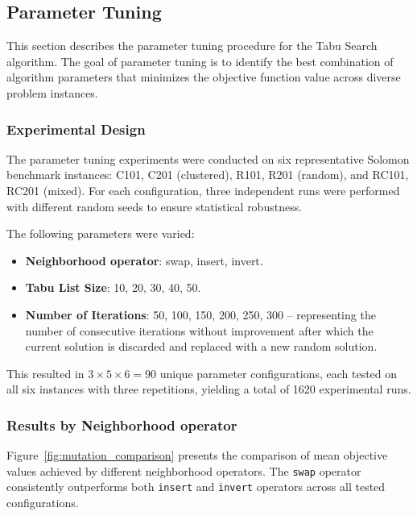 \subsection{Parameter Tuning}

This section describes the parameter tuning procedure for the Tabu Search algorithm. The goal of parameter tuning is to identify the best combination of algorithm parameters that minimizes the objective function value across diverse problem instances.

\subsubsection{Experimental Design}

The parameter tuning experiments were conducted on six representative Solomon benchmark instances: C101, C201 (clustered), R101, R201 (random), and RC101, RC201 (mixed). For each configuration, three independent runs were performed with different random seeds to ensure statistical robustness.

The following parameters were varied:
\begin{itemize}
    \item \textbf{Neighborhood operator}: swap, insert, invert.
    \item \textbf{Tabu List Size}: 10, 20, 30, 40, 50.
    \item \textbf{Number of Iterations}: 50, 100, 150, 200, 250, 300 -- representing the number of consecutive iterations without improvement after which the current solution is discarded and replaced with a new random solution.
\end{itemize}

This resulted in $3 \times 5 \times 6 = 90$ unique parameter configurations, each tested on all six instances with three repetitions, yielding a total of 1620 experimental runs.

\subsubsection{Results by Neighborhood operator}

Figure~\ref{fig:mutation_comparison} presents the comparison of mean objective values achieved by different neighborhood operators. The \texttt{swap} operator consistently outperforms both \texttt{insert} and \texttt{invert} operators across all tested configurations.

